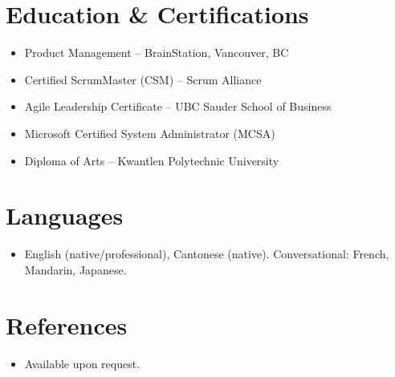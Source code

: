 \documentclass[11pt,a4paper,sans]{moderncv}
\newcommand{\flushitemize}{\setlength{\leftmargini}{0pt}\setlength{\labelsep}{0pt}\setlength{\labelwidth}{0pt}\setlength{\itemindent}{0pt}\setlength{\listparindent}{0pt}}
\begin{document}

\section{Education \& Certifications}
\vspace{1pt}
{\flushitemize
\begin{itemize}
\item Product Management -- BrainStation, Vancouver, BC
\item Certified ScrumMaster (CSM) -- Scrum Alliance
\item Agile Leadership Certificate -- UBC Sauder School of Business
\item Microsoft Certified System Administrator (MCSA)
\item Diploma of Arts -- Kwantlen Polytechnic University
\end{itemize}}


\section{Languages}
\vspace{1pt}
{\flushitemize
\begin{itemize}
\item English (native/professional), Cantonese (native). Conversational: French, Mandarin, Japanese.
\end{itemize}}


\section{References}
\vspace{1pt}
{\flushitemize
\begin{itemize}
\item{Available upon request.}
\end{itemize}}
\end{document}
